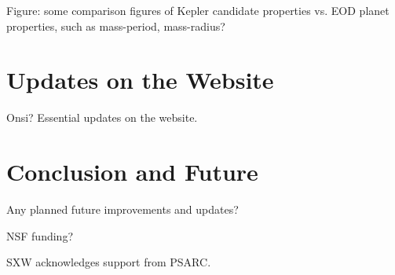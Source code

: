 \documentclass[11pt,preprint]{aastex}
\begin{document}
\begin{CJK*}{UTF8}{gbsn}
Figure: some comparison figures of Kepler candidate properties
vs. EOD planet properties, such as mass-period, mass-radius?


\section{Updates on the Website}\label{sec:website}

Onsi? Essential updates on the website.


\section{Conclusion and Future}\label{sec:conclusion}

Any planned future improvements and updates?


\acknowledgments

NSF funding?

SXW acknowledges support from PSARC.





\clearpage


\end{CJK*}
\end{document}
